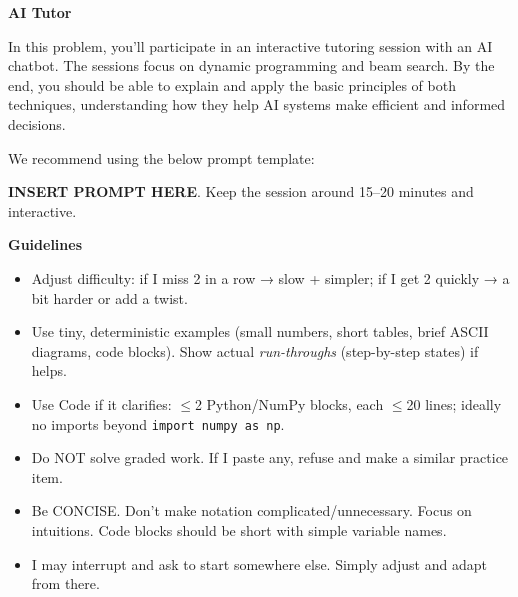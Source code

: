 \item {\bf AI Tutor}

In this problem, you'll participate in an interactive tutoring session with an AI chatbot. The sessions focus on dynamic programming and beam search. By the end, you should be able to explain and apply the basic principles of both techniques, understanding how they help AI systems make efficient and informed decisions.

We recommend using the below prompt template:
\begin{llmprompt}
\textbf{INSERT PROMPT HERE}. Keep the session around 15–20 minutes and interactive.

\medskip
\textbf{Guidelines}
\begin{itemize}[leftmargin=*,topsep=2pt,itemsep=2pt]
  \item Adjust difficulty: if I miss 2 in a row → slow + simpler; if I get 2 quickly → a bit harder or add a twist.
  \item Use tiny, deterministic examples (small numbers, short tables, brief ASCII diagrams, code blocks). Show actual \textit{run-throughs} (step-by-step states) if helps.
  \item Use Code if it clarifies: $\leq$2 Python/NumPy blocks, each $\leq$20 lines; ideally no imports beyond \texttt{import numpy as np}.
  \item Do NOT solve graded work. If I paste any, refuse and make a similar practice item.
  \item Be CONCISE. Don't make notation complicated/unnecessary. Focus on intuitions. Code blocks should be short with simple variable names.
  \item I may interrupt and ask to start somewhere else. Simply adjust and adapt from there.
\end{itemize}


\end{llmprompt}
